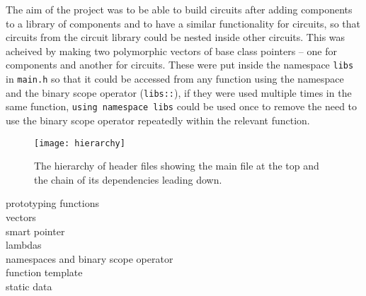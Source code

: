 The aim of the project was to be able to build circuits after adding components to a library of components and to have a similar functionality for circuits, so that circuits from the circuit library could be nested inside other circuits. This was acheived by making two polymorphic vectors of base class pointers -- one for components and another for circuits. These were put inside the namespace \verb!libs! in \verb!main.h! so that it could be accessed from any function using the namespace and the binary scope operator (\verb!libs::!), if they were used multiple times in the same function, \verb!using namespace libs! could be used once to remove the need to use the binary scope operator repeatedly within the relevant function. 

\begin{figure}
  \begin{center}
    \texttt{[image: hierarchy]}
  \end{center}
  \caption{The hierarchy of header files showing the main file at the top and the chain of its dependencies leading down.}
  \label{fig:hierarchy}
\end{figure}









prototyping functions\\

vectors\\
smart pointer\\
lambdas\\
namespaces and binary scope operator\\
function template\\
static data\\
